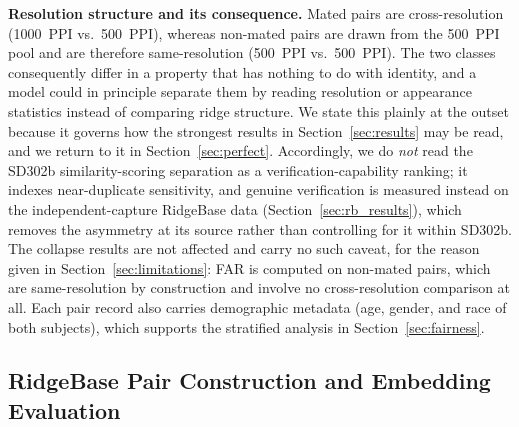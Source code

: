 \documentclass[journal]{IEEEtran}
\begin{document}
\textbf{Resolution structure and its consequence.}
Mated pairs are cross-resolution (1000~PPI vs.\ 500~PPI), whereas
non-mated pairs are drawn from the 500~PPI pool and are therefore
same-resolution (500~PPI vs.\ 500~PPI).
The two classes consequently differ in a property that has nothing to do
with identity, and a model could in principle separate them by reading
resolution or appearance statistics instead of comparing ridge structure.
We state this plainly at the outset because it governs how the strongest
results in Section~\ref{sec:results} may be read, and we return to it in
Section~\ref{sec:perfect}.
Accordingly, we do \emph{not} read the SD302b similarity-scoring separation as
a verification-capability ranking; it indexes near-duplicate sensitivity, and
genuine verification is measured instead on the independent-capture RidgeBase
data (Section~\ref{sec:rb_results}), which removes the asymmetry at its source
rather than controlling for it within SD302b.
The collapse results are not affected and carry no such caveat, for the
reason given in Section~\ref{sec:limitations}: FAR is computed on non-mated
pairs, which are same-resolution by construction and involve no
cross-resolution comparison at all.
Each pair record also carries demographic metadata (age, gender, and race
of both subjects), which supports the stratified analysis in
Section~\ref{sec:fairness}.

\subsection{RidgeBase Pair Construction and Embedding Evaluation}
\label{sec:rb_pairs}
\end{document}
